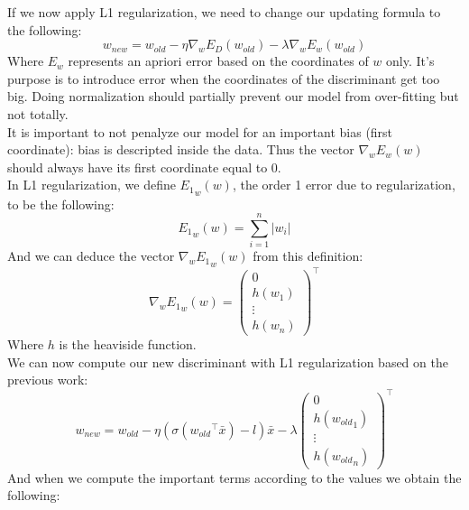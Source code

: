 \documentclass[a4paper, 10pt]{article}
\begin{document}
If we now apply L1 regularization, we need to change our updating formula to the following:
$$
w_{new} = w_{old} - \eta \nabla_w E_D(w_{old}) - \lambda \nabla_w E_w(w_{old})
$$
Where $E_w$ represents an apriori error based on the coordinates of $w$ only. It's purpose
is to introduce error when the coordinates of the discriminant get too big. Doing normalization
should partially prevent our model from over-fitting but not totally.
\\
It is important to not penalyze our model for an important bias (first coordinate): bias is descripted inside the data.
Thus the vector $\nabla_wE_w(w)$ should always have its first coordinate equal to $0$.
\\
In L1 regularization, we define ${E_1}_w(w)$, the order 1 error due to regularization, to be the following:
$$
{E_1}_w(w) = \sum_{i=1}^n \vert w_i \vert
$$
And we can deduce the vector $\nabla_w{E_1}_w(w)$ from this definition:
$$
\nabla_w{E_1}_w(w) = \left(\begin{array}{c}
    0       \\
    h(w_1)  \\
    \vdots  \\
    h(w_n)
\end{array}\right)^\top
$$
Where $h$ is the heaviside function.
\\
We can now compute our new discriminant with L1 regularization based on the previous work:
$$
w_{new} = w_{old} - \eta (\sigma({w_{old}}^\top \bar{x}) - l) \bar{x} - \lambda \left(\begin{array}{c}
                                                                                                0       \\
                                                                                                h({w_{old}}_1)  \\
                                                                                                \vdots  \\
                                                                                                h({w_{old}}_n)
                                                                                            \end{array}\right)^\top
$$
And when we compute the important terms according to the values we obtain the following:
\end{document}
